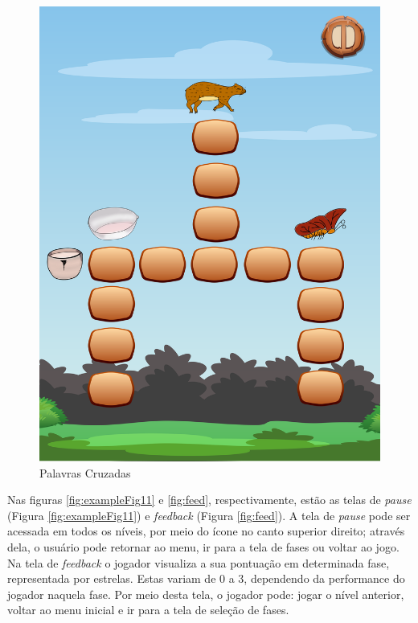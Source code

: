 \documentclass[12pt]{article}
\begin{document}
\begin{figure}[!htb]
			\includegraphics[width=\linewidth]{IMG/palavraCruzadas.png}
			\caption{Palavras Cruzadas}\label{fig:exampleFig8}
			\endminipage
		\end{figure}
	
		Nas figuras \ref{fig:exampleFig11} e \ref{fig:feed}, respectivamente, estão as telas de \textit{pause} (Figura \ref{fig:exampleFig11}) e \textit{feedback} (Figura \ref{fig:feed}). A tela de \textit{pause} pode ser acessada em todos os níveis, por meio do ícone no canto superior direito; através dela, o usuário pode retornar ao menu, ir para a tela de fases ou voltar ao jogo. Na tela de \textit{feedback} o jogador visualiza a sua pontuação em determinada fase, representada por estrelas. Estas variam de 0 a 3, dependendo da performance do jogador naquela fase. Por meio desta tela, o jogador pode: jogar o nível anterior, voltar ao menu inicial e ir para a tela de seleção de fases.
		
\end{document}
